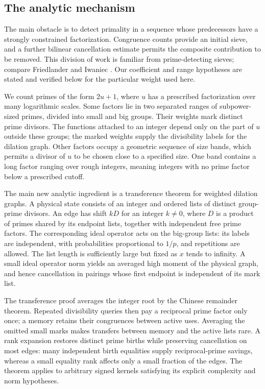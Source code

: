\subsection{The analytic mechanism}

The main obstacle is to detect primality in a sequence whose
predecessors have a strongly constrained factorization. Congruence
counts provide an initial sieve, and a further bilinear cancellation
estimate permits the composite contribution to be removed. This
division of work is familiar from prime-detecting sieves; compare
Friedlander and Iwaniec \cite[Section~1]{FriedlanderIwaniec1998}.
Our coefficient and range hypotheses are stated and verified below
for the particular weight used here.

We count primes of the form $2u+1$, where $u$ has a prescribed
factorization over many logarithmic scales. Some factors lie in
two separated ranges of subpower-sized primes, divided into small and
big groups. Their weights mark distinct prime divisors. The functions
attached to an integer depend only on the part of $u$ outside these
groups; the marked weights supply the divisibility
labels for the dilation graph. Other factors
occupy a geometric sequence of size bands, which permits a divisor
of $u$ to be chosen close to a specified size. One band contains a
long factor ranging over rough integers, meaning integers with no
prime factor below a prescribed cutoff.

The main new analytic ingredient is a transference theorem for
weighted dilation graphs. A physical state consists of an integer and
ordered lists of distinct group-prime divisors. An edge has shift
$kD$ for an integer $k\ne0$, where $D$ is a product of primes shared
by its endpoint lists,
together with independent free prime factors. The corresponding ideal
operator acts on the big-group lists: its labels are independent, with
probabilities proportional to $1/p$, and repetitions are allowed. The list length is sufficiently large
but fixed as $x$ tends to infinity. A small ideal operator norm yields
an averaged high moment of the physical graph, and hence cancellation
in pairings whose first endpoint is independent of its mark list.

The transference proof averages the integer root by the Chinese
remainder theorem. Repeated divisibility queries then pay a reciprocal
prime factor only once; a memory retains their congruences between
active uses. Averaging the omitted small marks makes transfers between
memory and the active lists rare. A rank expansion restores distinct
prime births while preserving cancellation on most edges: many
independent birth equalities supply reciprocal-prime savings, whereas
a small equality rank affects only a small fraction of the edges.
The theorem applies to arbitrary signed kernels satisfying its explicit
complexity and norm hypotheses.

